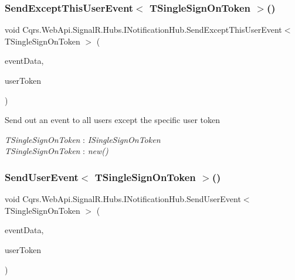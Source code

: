 \subsubsection{\texorpdfstring{Send\+Except\+This\+User\+Event$<$ T\+Single\+Sign\+On\+Token $>$()}{SendExceptThisUserEvent< TSingleSignOnToken >()}}
{\footnotesize\ttfamily void Cqrs.\+Web\+Api.\+Signal\+R.\+Hubs.\+I\+Notification\+Hub.\+Send\+Except\+This\+User\+Event$<$ T\+Single\+Sign\+On\+Token $>$ (\begin{DoxyParamCaption}\item[{\hyperlink{interfaceCqrs_1_1Events_1_1IEvent}{I\+Event}$<$ T\+Single\+Sign\+On\+Token $>$}]{event\+Data,  }\item[{string}]{user\+Token }\end{DoxyParamCaption})}



Send out an event to all users except the specific user token 

\begin{Desc}
\item[Type Constraints]\begin{description}
\item[{\em T\+Single\+Sign\+On\+Token} : {\em I\+Single\+Sign\+On\+Token}]\item[{\em T\+Single\+Sign\+On\+Token} : {\em new()}]\end{description}
\end{Desc}
\mbox{\label{interfaceCqrs_1_1WebApi_1_1SignalR_1_1Hubs_1_1INotificationHub_a34b0fc54fd594e3b9946521beb9bc8ee_a34b0fc54fd594e3b9946521beb9bc8ee}} 
\subsubsection{\texorpdfstring{Send\+User\+Event$<$ T\+Single\+Sign\+On\+Token $>$()}{SendUserEvent< TSingleSignOnToken >()}}
{\footnotesize\ttfamily void Cqrs.\+Web\+Api.\+Signal\+R.\+Hubs.\+I\+Notification\+Hub.\+Send\+User\+Event$<$ T\+Single\+Sign\+On\+Token $>$ (\begin{DoxyParamCaption}\item[{\hyperlink{interfaceCqrs_1_1Events_1_1IEvent}{I\+Event}$<$ T\+Single\+Sign\+On\+Token $>$}]{event\+Data,  }\item[{string}]{user\+Token }\end{DoxyParamCaption})}



